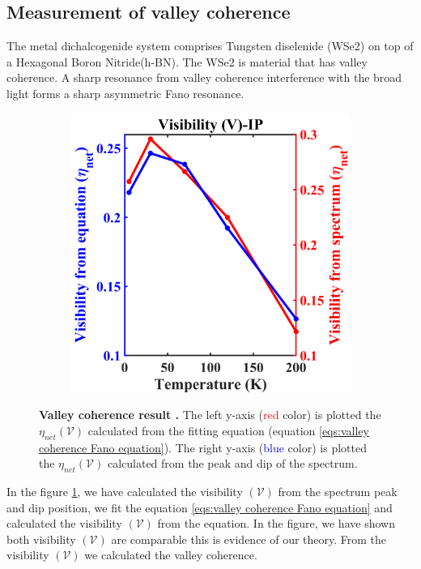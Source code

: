 \documentclass[13pt]{article}
\begin{document}
	\subsection{Measurement of valley coherence}
	\noindent
	\par
	The metal dichalcogenide system comprises Tungsten diselenide (WSe2) on top of a Hexagonal Boron Nitride(h-BN). The WSe2 is material that has valley coherence. A sharp resonance from valley coherence interference with the broad light forms a sharp asymmetric Fano resonance.
	\begin{figure}
		\centering
		\begin{subfigure}[]{.49\linewidth}
			\centering
			\includegraphics[width=\linewidth]{Figures/IP_V.png}
		\end{subfigure}
		\caption{\textbf{Valley coherence result .} The left y-axis (\textcolor{red}{red} color) is plotted the $\eta_{net} (\mathscr{V})$ calculated from the fitting equation (equation \ref{eqs:valley coherence Fano equation}). The right y-axis (\textcolor{blue}{blue} color) is plotted the $\eta_{net} (\mathscr{V})$ calculated from the peak and dip of the spectrum.}
		\label{fig:valley}
	\end{figure}
	\par 
	In the figure \ref{fig:valley}, we have calculated the visibility $(\mathscr{V})$ from the spectrum peak and dip position, we fit the equation \ref{eqs:valley coherence Fano equation} and calculated the visibility $(\mathscr{V})$ from the equation. In the figure, we have shown both visibility $(\mathscr{V})$ are comparable this is evidence of our theory. From the visibility $(\mathscr{V})$ we calculated the valley coherence. 
	
\end{document}
